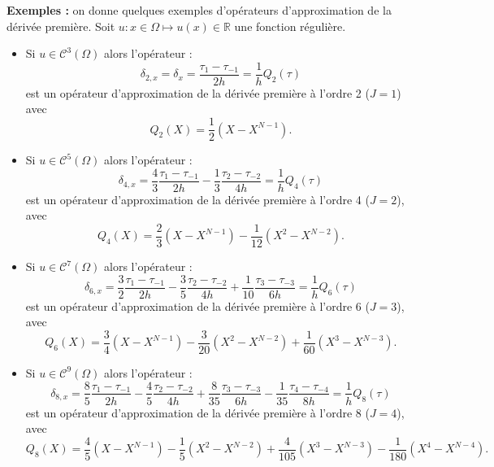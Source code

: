 \textbf{Exemples :}
on donne quelques exemples d'opérateurs d'approximation de la dérivée première. Soit $u :  x \in \Omega \mapsto u(x) \in \mathbb{R}$ une fonction régulière. 
\begin{itemize}
\item Si $u \in \mathcal{C}^3 (\Omega)$ alors l'opérateur :
\begin{equation}
\delta_{2,x} = \delta_x = \dfrac{\tau_1 - \tau_{-1}}{2h} = \dfrac{1}{h}Q_2(\tau)
\label{eq:derprem_order2}
\end{equation}
est un opérateur d'approximation de la dérivée première à l'ordre 2 ($J=1$) avec 
\begin{equation}
Q_2(X) = \dfrac{1}{2}(X-X^{N-1}).
\end{equation}
\item Si $u \in \mathcal{C}^5 (\Omega)$ alors l'opérateur :
\begin{equation}
\delta_{4,x} = \dfrac{4}{3} \dfrac{\tau_1 - \tau_{-1}}{2h} - \dfrac{1}{3} \dfrac{\tau_2 - \tau_{-2}}{4h} = \dfrac{1}{h}Q_4(\tau)
\label{eq:derprem_order4}
\end{equation}
est un opérateur d'approximation de la dérivée première à l'ordre 4 ($J=2$), avec
\begin{equation}
Q_4(X) = \dfrac{2}{3} (X-X^{N-1}) - \dfrac{1}{12} (X^2-X^{N-2}).
\end{equation}
\item Si $u \in \mathcal{C}^7 (\Omega)$ alors l'opérateur :
\begin{equation}
\delta_{6,x} = \dfrac{3}{2} \dfrac{\tau_1 - \tau_{-1}}{2h} - \dfrac{3}{5} \dfrac{\tau_2 - \tau_{-2}}{4h} + \dfrac{1}{10} \dfrac{\tau_3 - \tau_{-3}}{6h} = \dfrac{1}{h} Q_6(\tau)
\label{eq:derprem_order6}
\end{equation}
est un opérateur d'approximation de la dérivée première à l'ordre 6 ($J=3$), avec
\begin{equation}
Q_6(X) = \dfrac{3}{4} (X-X^{N-1}) - \dfrac{3}{20} (X^2-X^{N-2}) + \dfrac{1}{60} (X^3-X^{N-3}).
\end{equation}
\item Si $u \in \mathcal{C}^9 (\Omega)$ alors l'opérateur :
\begin{equation}
\delta_{8,x} = \dfrac{8}{5} \dfrac{\tau_1 - \tau_{-1}}{2h} - \dfrac{4}{5} \dfrac{\tau_2 - \tau_{-2}}{4h} + \dfrac{8}{35} \dfrac{\tau_3 - \tau_{-3}}{6h} - \dfrac{1}{35} \dfrac{\tau_4 - \tau_{-4}}{8h} = \dfrac{1}{h}Q_8(\tau)
\label{eq:derprem_order8}
\end{equation}
est un opérateur d'approximation de la dérivée première à l'ordre 8 ($J=4$), avec
\begin{equation}
Q_8(X) = \dfrac{4}{5} (X-X^{N-1}) - \dfrac{1}{5} (X^2-X^{N-2}) + \dfrac{4}{105} (X^3-X^{N-3}) - \dfrac{1}{180} (X^4-X^{N-4}).
\end{equation}
\end{itemize}


